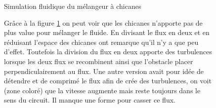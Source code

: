 \documentclass[a4paper, 11pt]{article}
\begin{document}
\begin{multicols}{2}
    \begin{figure}[H]
        \centering
        \caption{Simulation fluidique du mélangeur à chicanes}
        \label{fig:simulation2}
    \end{figure}
    \begin{figure}[H]
        Grâce à la figure \ref{fig:simulation2} on peut voir que les chicanes n'apporte pas
        de plus value pour mélanger le fluide.
        En divisant le flux en deux et en réduisant l'espace des chicanes ont remarque qu'il
        n'y a que peu d'effet.
        Toutefois la division du flux en deux apporte des turbulences lorsque les deux flux
        se recombinent ainsi que l'obstacle placer perpendiculairement au flux.
        Une autre version avait pour idée de détendre et de comprimé le flux afin de crée des
        turbulences, on voit (zone coloré) que la vitesse augmente mais reste toujours dans
        le sens du circuit.
        Il manque une forme pour casser ce flux.
    \end{figure}
\end{multicols}
\end{document}

